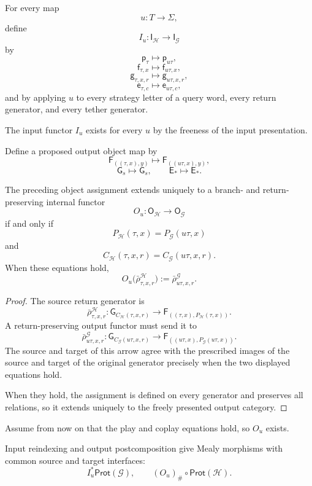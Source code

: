 For every map
\[
  u:T\to\Sigma,
\]
define
\[
  I_u:
  \mathsf I_{\mathcal H}
  \longrightarrow
  \mathsf I_{\mathcal G}
\]
by
\[
  \mathsf p_\tau\longmapsto\mathsf p_{u\tau},
\]
\[
  \mathsf f_{\tau,x}\longmapsto\mathsf f_{u\tau,x},
\]
\[
  \mathsf g_{\tau,x,r}\longmapsto\mathsf g_{u\tau,x,r},
\]
\[
  \mathsf e_{\tau,c}\longmapsto\mathsf e_{u\tau,c},
\]
and by applying \(u\) to every strategy letter of a query word, every return generator, and every
tether generator.

The input functor \(I_u\) exists for every \(u\) by the freeness of the input presentation.

Define a proposed output object map by
\[
  \mathsf F_{((\tau,x),y)}
  \longmapsto
  \mathsf F_{((u\tau,x),y)},
\]
\[
  \mathsf G_s\longmapsto\mathsf G_s,
  \qquad
  \mathsf E_*\longmapsto\mathsf E_*.
\]

\begin{lemma}
\label{lem:output-reindexing-exists}
The preceding object assignment extends uniquely to a branch- and return-preserving internal functor
\[
  O_u:
  \mathsf O_{\mathcal H}
  \longrightarrow
  \mathsf O_{\mathcal G}
\]
if and only if
\[
  P_{\mathcal H}(\tau,x)
  =
  P_{\mathcal G}(u\tau,x)
\]
and
\[
  C_{\mathcal H}(\tau,x,r)
  =
  C_{\mathcal G}(u\tau,x,r).
\]
When these equations hold,
\[
  O_u
  \bigl(
    \bar\rho^{\mathcal H}_{\tau,x,r}
  \bigr)
  :=
  \bar\rho^{\mathcal G}_{u\tau,x,r}.
\]
\end{lemma}

\begin{proof}
The source return generator is
\[
  \bar\rho^{\mathcal H}_{\tau,x,r}:
  \mathsf G_{C_{\mathcal H}(\tau,x,r)}
  \longrightarrow
  \mathsf F_{((\tau,x),P_{\mathcal H}(\tau,x))}.
\]
A return-preserving output functor must send it to
\[
  \bar\rho^{\mathcal G}_{u\tau,x,r}:
  \mathsf G_{C_{\mathcal G}(u\tau,x,r)}
  \longrightarrow
  \mathsf F_{((u\tau,x),P_{\mathcal G}(u\tau,x))}.
\]
The source and target of this arrow agree with the prescribed images of the source and target of the
original generator precisely when the two displayed equations hold.

When they hold, the assignment is defined on every generator and preserves all relations, so it
extends uniquely to the freely presented output category.
\end{proof}

Assume from now on that the play and coplay equations hold, so \(O_u\) exists.

Input reindexing and output postcomposition give Mealy morphisms with common source and target
interfaces:
\[
  I_u^*\mathsf{Prot}(\mathcal G),
  \qquad
  (O_u)_\#\circ\mathsf{Prot}(\mathcal H).
\]

